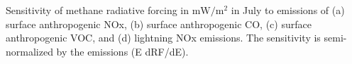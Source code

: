 Sensitivity of methane radiative forcing in $\mathrm{mW/m^2}$ in July to emissions of (a) surface anthropogenic NOx, (b) surface anthropogenic CO, (c) surface anthropogenic VOC, and (d) lightning NOx emissions. The sensitivity is semi-normalized by the emissions (E dRF/dE). \label{fig:drfdenox}